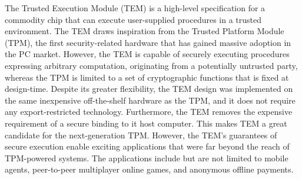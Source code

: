 % 
% 
%
The Trusted Execution Module (TEM) is a high-level specification for a
commodity chip that can execute user-supplied procedures in a trusted
environment. The TEM draws inspiration from the Trusted Platform Module (TPM),
the first security-related hardware that has gained massive adoption in the PC
market. However, the TEM is capable of securely executing procedures expressing
arbitrary computation, originating from a potentially untrusted party, whereas
the TPM is limited to a set of cryptographic functions that is fixed at
design-time. Despite its greater flexibility, the TEM design was implemented on
the same inexpensive off-the-shelf hardware as the TPM, and it does not require
any export-restricted technology. Furthermore, the TEM removes the expensive
requirement of a secure binding to it  host computer. This makes TEM a great
candidate for the next-generation TPM. However, the TEM's guarantees of
secure execution enable exciting applications that were far beyond the reach of
TPM-powered systems. The applications include but are not limited to mobile
agents, peer-to-peer multiplayer online games, and anonymous offline payments.
